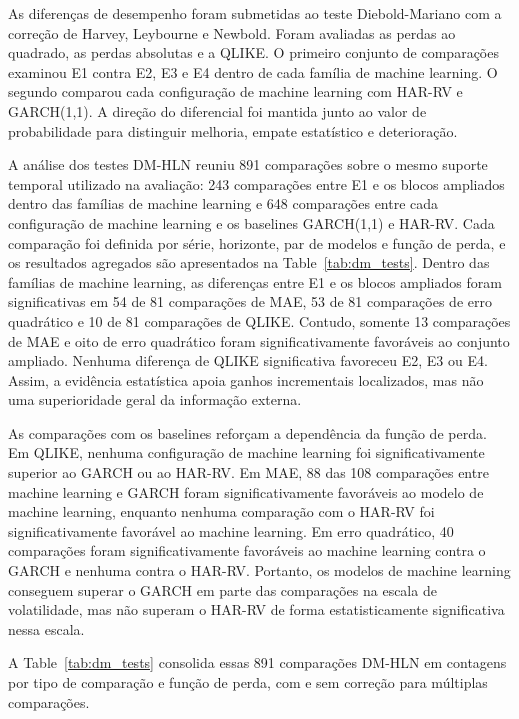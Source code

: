 \documentclass[a4paper,fleqn]{cas-sc}
\begin{document}
As diferenças de desempenho foram submetidas ao teste Diebold-Mariano com a correção de Harvey, Leybourne e Newbold. Foram avaliadas as perdas ao quadrado, as perdas absolutas e a QLIKE. O primeiro conjunto de comparações examinou E1 contra E2, E3 e E4 dentro de cada família de machine learning. O segundo comparou cada configuração de machine learning com HAR-RV e GARCH(1,1). A direção do diferencial foi mantida junto ao valor de probabilidade para distinguir melhoria, empate estatístico e deterioração.

A análise dos testes DM-HLN reuniu 891 comparações sobre o mesmo suporte temporal utilizado na avaliação: 243 comparações entre E1 e os blocos ampliados dentro das famílias de machine learning e 648 comparações entre cada configuração de machine learning e os baselines GARCH(1,1) e HAR-RV. Cada comparação foi definida por série, horizonte, par de modelos e função de perda, e os resultados agregados são apresentados na Table~\ref{tab:dm_tests}. Dentro das famílias de machine learning, as diferenças entre E1 e os blocos ampliados foram significativas em 54 de 81 comparações de MAE, 53 de 81 comparações de erro quadrático e 10 de 81 comparações de QLIKE. Contudo, somente 13 comparações de MAE e oito de erro quadrático foram significativamente favoráveis ao conjunto ampliado. Nenhuma diferença de QLIKE significativa favoreceu E2, E3 ou E4. Assim, a evidência estatística apoia ganhos incrementais localizados, mas não uma superioridade geral da informação externa.

As comparações com os baselines reforçam a dependência da função de perda. Em QLIKE, nenhuma configuração de machine learning foi significativamente superior ao GARCH ou ao HAR-RV. Em MAE, 88 das 108 comparações entre machine learning e GARCH foram significativamente favoráveis ao modelo de machine learning, enquanto nenhuma comparação com o HAR-RV foi significativamente favorável ao machine learning. Em erro quadrático, 40 comparações foram significativamente favoráveis ao machine learning contra o GARCH e nenhuma contra o HAR-RV. Portanto, os modelos de machine learning conseguem superar o GARCH em parte das comparações na escala de volatilidade, mas não superam o HAR-RV de forma estatisticamente significativa nessa escala.

A Table~\ref{tab:dm_tests} consolida essas 891 comparações DM-HLN em contagens por tipo de comparação e função de perda, com e sem correção para múltiplas comparações.
\end{document}
